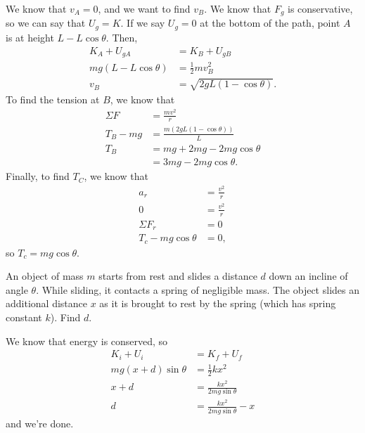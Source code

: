 \documentclass[11pt]{article}
\begin{document}
\begin{solution}
	We know that $v_A = 0$, and we want to find $v_B$. We know that $F_g$ is conservative, so we can say that $U_g = K$. If we say $U_g = 0$ at the bottom of the path, point $A$ is at height $L - L\cos\theta$. Then,
	\begin{align*}
		K_A + U_{gA} &= K_{B} + U_{gB} \\
		mg(L-L\cos\theta) &= \frac{1}{2}mv_B^2 \\
		v_B &= \sqrt{2gL(1-\cos\theta)}.
	\end{align*}
	To find the tension at $B$, we know that
	\begin{align*}
		\Sigma F &= \frac{mv^2}{r} \\
		T_B - mg &= \frac{m(2gL(1-\cos\theta))}{L} \\
		T_B &= mg + 2mg - 2mg\cos\theta \\
		&= 3mg - 2mg\cos\theta.
	\end{align*}
	Finally, to find $T_C$, we know that
	\begin{align*}
		a_r &= \frac{v^2}{r} \\
		0 &= \frac{v^2}{r} \\
		\Sigma F_r &= 0 \\
		T_c - mg\cos\theta &= 0,
	\end{align*}
	so $T_c = mg\cos\theta$.
\end{solution}

\begin{example}
	An object of mass $m$ starts from rest and slides a distance $d$ down an incline of angle $\theta$. While sliding, it contacts a spring of negligible mass. The object slides an additional distance $x$ as it is brought to rest by the spring (which has spring constant $k$). Find $d$.
\end{example}
\begin{solution}
	We know that energy is conserved, so
	\begin{align*}
		K_i + U_i &= K_f + U_f \\
		mg(x+d)\sin\theta &= \frac{1}{2}kx^2 \\
		x + d &= \frac{kx^2}{2mg\sin\theta} \\
		d &=\frac{kx^2}{2mg\sin\theta} - x
	\end{align*}
	and we're done.
\end{solution}
\end{document}
